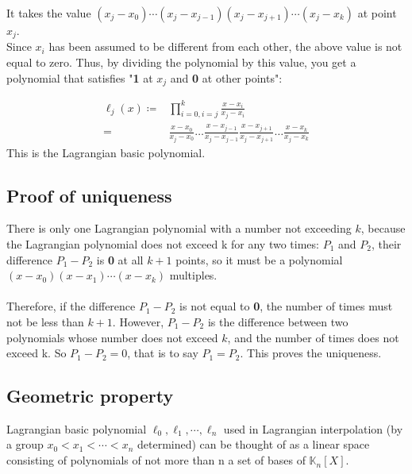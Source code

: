 \documentclass[12pt,a4paper]{article}
\begin{document}
\begin{spacing}{1.5}
\noindent It takes the value $(x_{j}-x_{0})\cdots (x_{j}-x_{{j-1}})(x_{j}-x_{{j+ 1}})\cdots (x_{j}-x_{{k}})$ at point $x_{j}$.\\

\noindent Since $x_{i}$ has been assumed to be different from each other, the above value is not equal to zero. Thus, by dividing the polynomial by this value, you get a polynomial that satisfies "\textbf{1} at $x_{j}$ and \textbf{0} at other points":

\begin{equation*}
\begin{aligned}
	\ell_j(x) \coloneqq &\prod_{i = 0,i = j}^k 
	\frac{x-x_i}{x_j-x_i} \\
	= &\frac{x-x_0}{x_j-x_0} \ldots
	\frac{x-x_{j-1}}{x_j-x_{j-1}}
	\frac{x-x_{j+1}}{x_j-x_{j+1}} \ldots
	\frac{x-x_k}{x_j-x_k}
\end{aligned}
\end{equation*}
\newline
\noindent This is the Lagrangian basic polynomial.

\newpage
\subsection{Proof of uniqueness}

There is only one Lagrangian polynomial with a number not exceeding $k$, because the Lagrangian polynomial does not exceed k for any two times: 
$P_{1}$ and $P_{2}$, their difference $P_{1}-P_{ 2}$ is \textbf{0} at all $k+1$ points, so it must be a polynomial $(x-x_{0})(x-x_{{1}})\cdots (x-x_{{k}})$ multiples. \\\\
Therefore, if the difference $P_{1}-P_{2}$ is not equal to \textbf{0}, the number of times must not be less than $k+1$. However, $P_{1}-P_{2}$ is the difference between two polynomials whose number does not exceed $k$, and the number of times does not exceed k. So $P_{1}-P_{2}=0$, that is to say $P_{1}=P_{2}$. This proves the uniqueness.

\newpage
\subsection{Geometric property}

Lagrangian basic polynomial $\ell_{0}, \ell_{1}, \cdots, \ell_{n}$ used in Lagrangian interpolation (by a group $x_{0} < x_{1}< \cdots <x_{n}$ determined) can be thought of as a linear space consisting of polynomials of not more than n a set of bases of ${\mathbb {K}}_{n}[X]$.\\


\end{spacing}
\end{document}
